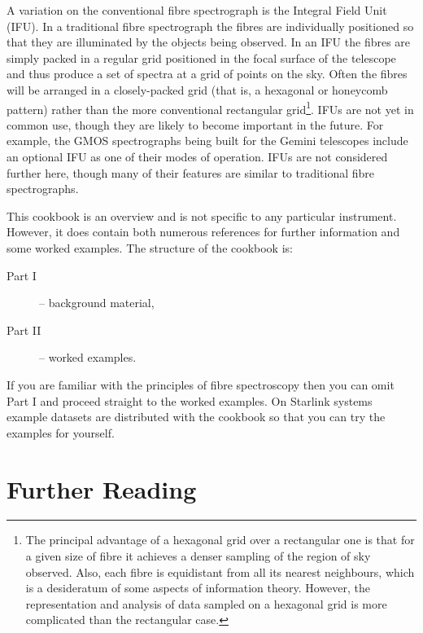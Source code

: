 \documentclass[chapters,twoside,11pt]{starlink}
\begin{document}
A variation on the conventional fibre spectrograph is the Integral
Field Unit (IFU).  In a traditional fibre spectrograph the fibres
are individually positioned so that they are illuminated by the
objects being observed.  In an IFU the fibres are simply packed in a
regular grid positioned in the focal surface of the telescope and thus
produce a set of spectra at a grid of points on the sky.  Often the
fibres will be arranged in a closely-packed grid (that is, a hexagonal
or honeycomb pattern) rather than the more conventional rectangular
grid\footnote{The principal advantage of a hexagonal grid over a
rectangular one is that for a given size of fibre it achieves a
denser sampling of the region of sky observed.  Also, each fibre is
equidistant from all its nearest neighbours, which is a desideratum of
some aspects of information theory.  However, the representation and
analysis of data sampled on a hexagonal grid is more complicated than
the rectangular case.}.  IFUs are not yet in common use, though they
are likely to become important in the future.  For example, the
GMOS spectrographs\cite{ALLINGTON97} being built for the Gemini
telescopes include an optional IFU as one of their modes of operation.
IFUs are not considered further here, though many of their features
are similar to traditional fibre spectrographs.

This cookbook is an overview and is not specific to any particular
instrument.  However, it does contain both numerous references for
further information and some worked examples.  The structure of the
cookbook is:

\begin{description}

  \item[{\rm Part I}] -- background material,

  \item[{\rm Part II}] -- worked examples.

\end{description}

If you are familiar with the principles of fibre spectroscopy then
you can omit Part I and proceed straight to the worked examples.  On
Starlink systems example datasets are distributed with the cookbook
so that you can try the examples for yourself.


\section{\label{FURTHER}Further Reading}
\end{document}
